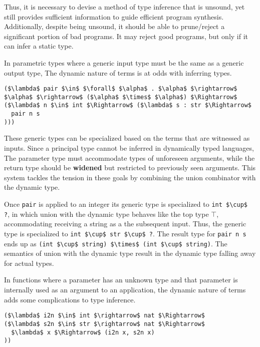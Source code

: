 \documentclass[sigplan,screen]{acmart}
\begin{document}
Thus, it is necessary to devise a method of type inference that is unsound, 
yet still provides sufficient information to guide efficient program synthesis.
Additionally, despite being unsound, it should be able to prune/reject 
a significant portion of bad programs. 
It may reject good programs, but only if it can infer a static type.

In parametric types where a generic input type must be the same as a generic output type,
The dynamic nature of terms is at odds with inferring types.

\begin{lstlisting}
($\lambda$ pair $\in$ $\forall$ $\alpha$ . $\alpha$ $\rightarrow$ $\alpha$ $\rightarrow$ ($\alpha$ $\times$ $\alpha$) $\Rightarrow$ 
($\lambda$ n $\in$ int $\Rightarrow$ ($\lambda$ s : str $\Rightarrow$ 
  pair n s
)))
\end{lstlisting}

\noindent These generic types can be specialized based on the terms that are witnessed as inputs. 
Since a principal type cannot be inferred in dynamically typed languages, 
The parameter type must accommodate types of unforeseen arguments, 
while the return type should be \textbf{widened} but restricted 
to previously seen arguments.
This system tackles the tension in these goals by combining the union combinator  
with the dynamic type. 

Once \lstinline{pair} is applied to an integer its generic type is specialized to 
\lstinline{int $\cup$ ?}, 
in which union with the dynamic type behaves like the top type $\top$, 
accommodating receiving a string as a the subsequent input.
Thus, the generic type is specialized to \lstinline{int $\cup$ str $\cup$ ?}.
The result type for \lstinline{pair n s} ends up as 
\lstinline{(int $\cup$ string) $\times$ (int $\cup$ string)}. 
The semantics of union with the dynamic type result in the dynamic type 
falling away for actual types.

In functions where a parameter has an unknown type and that parameter is 
internally used as an argument to an application, the dynamic nature of terms  
adds some complications to type inference.

\begin{lstlisting}
($\lambda$ i2n $\in$ int $\rightarrow$ nat $\Rightarrow$ 
($\lambda$ s2n $\in$ str $\rightarrow$ nat $\Rightarrow$ 
  $\lambda$ x $\Rightarrow$ (i2n x, s2n x)
))

\end{lstlisting}
\end{document}
